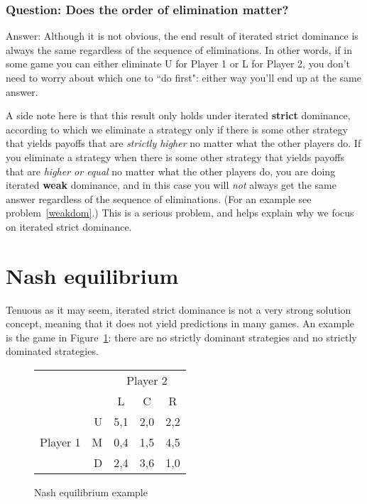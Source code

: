  \subsubsection{Question\rm : Does the order of elimination matter?}

\noindent Answer: Although it is not obvious, the end result of iterated strict dominance is always the same regardless of the sequence of eliminations. In other words, if in some game you can either eliminate U for Player 1 or L for Player 2, you don't need to worry about which one to ``do first": either way you'll end up at the same answer.

A side note here is that this result only holds under iterated \textbf{strict} dominance, according to which we eliminate a strategy only if there is some other strategy that yields payoffs that are \emph{strictly higher} no matter what the other players do. If you eliminate a strategy when there is some other strategy that yields payoffs that are \emph{higher or equal} no matter what the other players do, you are doing iterated \textbf{weak} dominance, and in this case you will \emph{not} always get the same answer regardless of the sequence of eliminations. (For an example see problem~\ref{weakdom}.) This is a serious problem, and helps explain why we focus on iterated strict dominance.











\section{Nash equilibrium}

Tenuous as it may seem, iterated strict dominance is not a very strong solution concept, meaning that it does not yield predictions in many games. An example is the game in Figure~\ref{game:nash1}: there are no strictly dominant strategies and no strictly dominated strategies.



\begin{figure}[b]
\begin{center}
\begin{tabular}{crccc}
& & \multicolumn{3}{c}{Player 2} \\ [.15cm]
& & L & C & R \\ \cline{3-5}
\multirow{3}{1.5cm}{Player 1}
& U & \multicolumn{1}{|c|}{5,1} & \multicolumn{1}{c}{2,0} & \multicolumn{1}{|c|}{2,2} \\ \cline{3-5}
& M & \multicolumn{1}{|c|}{0,4} & \multicolumn{1}{c}{1,5} & \multicolumn{1}{|c|}{4,5} \\ \cline{3-5}
& D & \multicolumn{1}{|c|}{2,4} & \multicolumn{1}{c}{3,6} & \multicolumn{1}{|c|}{1,0} \\ \cline{3-5}
\end{tabular}
\end{center}
\caption{Nash equilibrium example}
\label{game:nash1} %
\end{figure}

